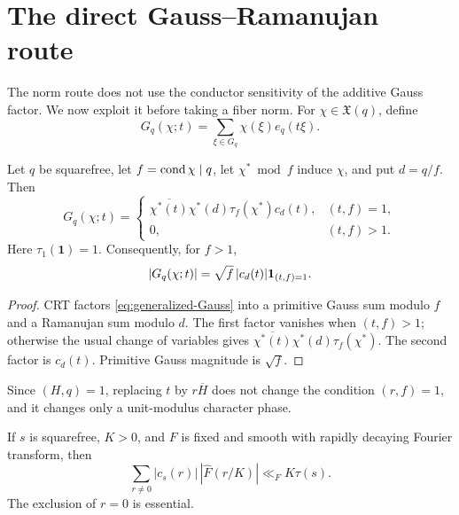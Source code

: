 \section{The direct Gauss--Ramanujan route}
\label{sec:gauss-complementarity}

The norm route does not use the conductor sensitivity of the additive
Gauss factor.  We now exploit it before taking a fiber norm.  For
\(\chi\in\mathfrak X(q)\), define
\begin{equation}
 G_q(\chi;t)=\sum_{\xi\in G_q}\chi(\xi)e_q(t\xi).
 \label{eq:generalized-Gauss}
\end{equation}

\begin{lemma}
\label{lem:induced-Gauss}
Let \(q\) be squarefree, let \(f=\operatorname{cond}\chi\mid q\), let
\(\chi^*\bmod f\) induce \(\chi\), and put \(d=q/f\).  Then
\begin{equation}
 G_q(\chi;t)=
 \begin{cases}
  \overline{\chi^*(t)}\chi^*(d)\tau_f(\chi^*)c_d(t),
     &(t,f)=1,\\
  0,&(t,f)>1.
 \end{cases}
 \label{eq:induced-Gauss}
\end{equation}
Here \(\tau_1(\mathbf1)=1\).  Consequently, for \(f>1\),
\begin{equation}
 |G_q(\chi;t)|
 =\sqrt f\,|c_d(t)|\mathbf 1_{(t,f)=1}.
 \label{eq:induced-Gauss-size}
\end{equation}
\end{lemma}

\begin{proof}
CRT factors \eqref{eq:generalized-Gauss} into a primitive Gauss sum
modulo \(f\) and a Ramanujan sum modulo \(d\).  The first factor
vanishes when \((t,f)>1\); otherwise the usual change of variables
gives \(\overline{\chi^*(t)}\chi^*(d)\tau_f(\chi^*)\).
The second factor is \(c_d(t)\).  Primitive Gauss magnitude is
\(\sqrt f\).
\end{proof}

Since \((H,q)=1\), replacing \(t\) by \(r\overline H\) does not change
the condition \((r,f)=1\), and it changes only a unit-modulus character
phase.

\begin{lemma}
\label{lem:Ramanujan-Fourier}
If \(s\) is squarefree, \(K>0\), and \(F\) is fixed and smooth with
rapidly decaying Fourier transform, then
\begin{equation}
 \boxed{
 \sum_{r\ne0}|c_s(r)|\,|\widehat F(r/K)|
 \ll_F K\tau(s).}
 \label{eq:Ramanujan-Fourier}
\end{equation}
The exclusion of \(r=0\) is essential.
\end{lemma}

